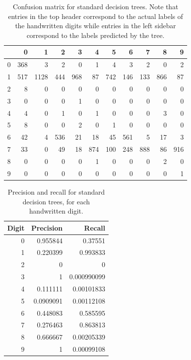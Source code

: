 \begin{table}
	\begin{tabular}{r|rrrrrrrrrr}
		&   0 &    1 &   2 &   3 &   4 &   5 &   6 &   7 &   8 &   9 \\
		\hline
		0 & 368 &    3 &   2 &   0 &   1 &   4 &   3 &   2 &   0 &   2 \\
		1 & 517 & 1128 & 444 & 968 &  87 & 742 & 146 & 133 & 866 &  87 \\
		2 &   8 &    0 &   0 &   0 &   0 &   0 &   0 &   0 &   0 &   0 \\
		3 &   0 &    0 &   0 &   1 &   0 &   0 &   0 &   0 &   0 &   0 \\
		4 &   4 &    0 &   1 &   0 &   1 &   0 &   0 &   0 &   3 &   0 \\
		5 &   8 &    0 &   0 &   2 &   0 &   1 &   0 &   0 &   0 &   0 \\
		6 &  42 &    4 & 536 &  21 &  18 &  45 & 561 &   5 &  17 &   3 \\
		7 &  33 &    0 &  49 &  18 & 874 & 100 & 248 & 888 &  86 & 916 \\
		8 &   0 &    0 &   0 &   0 &   1 &   0 &   0 &   0 &   2 &   0 \\
		9 &   0 &    0 &   0 &   0 &   0 &   0 &   0 &   0 &   0 &   1 \\
	\end{tabular}
	\caption{Confusion matrix for standard decision trees.  Note that entries in the top header correspond to the actual labels of the handwritten digits while entries in the left sidebar correspond to the labels predicted by the tree.}
	\label{table:no_kd_confusion}
\end{table}

\begin{table}
	\centering
	\begin{tabular}{rrr}
		Digit &   Precision &      Recall \\
		\hline
		0 &   0.955844  & 0.37551     \\
		1 &   0.220399  & 0.993833    \\
		2 &   0         & 0           \\
		3 &   1         & 0.000990099 \\
		4 &   0.111111  & 0.00101833  \\
		5 &   0.0909091 & 0.00112108  \\
		6 &   0.448083  & 0.585595    \\
		7 &   0.276463  & 0.863813    \\
		8 &   0.666667  & 0.00205339  \\
		9 &   1         & 0.00099108  \\
	\end{tabular}
	\caption{Precision and recall for standard decision trees, for each handwritten digit.}
	\label{table:no_kd_precision_recall}
\end{table}

